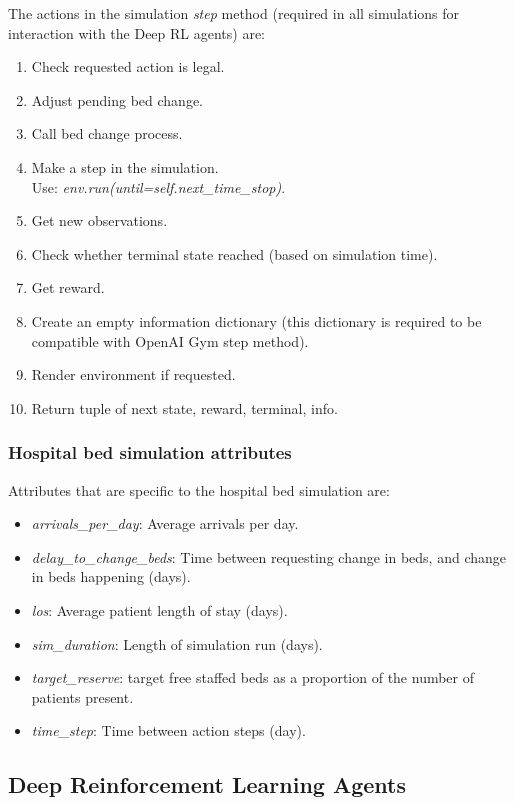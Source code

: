 \documentclass{article}
\begin{document}
\begin{multicols}{2}
The actions in the simulation \emph{step} method (required in all simulations for interaction with the Deep RL agents) are:

\begin{enumerate}
    \item Check requested action is legal.
    \item Adjust pending bed change.
    \item Call bed change process.
    \item Make a step in the simulation.\\ Use: \emph{env.run(until=self.next\_time\_stop)}.
    \item Get new observations.
    \item Check whether terminal state reached (based on simulation time).
    \item Get reward.
    \item Create an empty information dictionary (this dictionary is required to be compatible with OpenAI Gym step method).
    \item Render environment if requested.
    \item Return tuple of next state, reward, terminal, info.
\end{enumerate}

\subsubsection{Hospital bed simulation attributes}

Attributes that are specific to the hospital bed simulation are:

\begin{itemize}
    \item \emph{arrivals\_per\_day}: Average arrivals per day.
    \item \emph{delay\_to\_change\_beds}: Time between requesting change in beds, and change in beds happening (days).
    \item \emph{los}: Average patient length of stay (days).
    \item \emph{sim\_duration}: Length of simulation run (days).
    \item \emph{target\_reserve}: target free staffed beds as a proportion of the number of patients present.
    \item \emph{time\_step}: Time between action steps (day).
\end{itemize}


\subsection{Deep Reinforcement Learning Agents}


\end{multicols}
\end{document}
